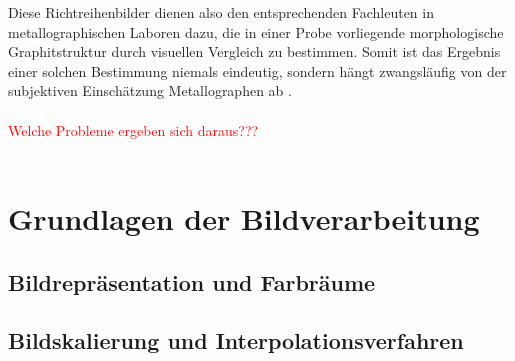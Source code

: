 \documentclass[
fontsize=10pt, 
listof = totoc,
parskip = half	
]{report}
\begin{document}
\noindent Diese Richtreihenbilder dienen also den entsprechenden Fachleuten in metallographischen Laboren dazu, die in einer Probe vorliegende morphologische Graphitstruktur durch visuellen Vergleich zu bestimmen. Somit ist das Ergebnis einer solchen Bestimmung niemals eindeutig, sondern hängt zwangsläufig von der subjektiven Einschätzung Metallographen ab \cite{ISO945}.
\\\\
\textcolor{red}{Welche Probleme ergeben sich daraus???}
\\\\


\section{Grundlagen der Bildverarbeitung}
\label{GrundlagenBildverarbeitung}

\subsection{Bildrepräsentation und Farbräume}
\label{Bildrep}

\subsection{Bildskalierung und Interpolationsverfahren}
\label{subsec:SkalierungUndInterpolation}
\end{document}
